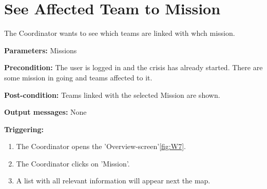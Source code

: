 \section{See Affected Team to Mission}
\label{operation:TeamToMission}
The Coordinator wants to see which teams are linked with whch mission.
\begin{description}
\item \textbf{Parameters:} Missions
\item \textbf{Precondition:} The user is logged in and the
crisis has already started. There are some mission in going and teams affected
to it.
\item \textbf{Post-condition:} Teams linked with the selected Mission are
shown.
\item \textbf{Output messages:} None
\item \textbf{Triggering:}
\begin{enumerate}
\item The Coordinator opens the 'Overview-screen'\ref{fig:W7}.
\item The Coordinator clicks on 'Mission'.
\item A list with all relevant information will appear next the map.
\end{enumerate}
\end{description}  





